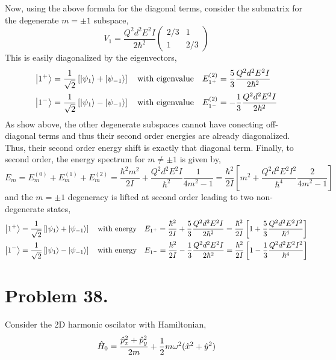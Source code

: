\documentclass[12pt]{extarticle}
\begin{document}
Now, using the above formula for the diagonal terms, consider the submatrix for the degenerate $m = \pm 1$ subspace,
\[ V_1 = \frac{Q^2 d^2 E^2 I}{2\hbar^2} \begin{pmatrix}
2/3 & 1 \\
1 & 2/3 
\end{pmatrix}\]
This is easily diagonalized by the eigenvectors,
\begin{align*}
\left| 1^{+} \right> & = \frac{1}{\sqrt{2}} \left[ \left| \psi_1 \right> + \left| \psi_{-1} \right> \right] \quad \text{with eigenvalue} \quad E^{(2)}_{1^+} = \frac{5}{3} \frac{Q^2 d^2 E^2 I}{2\hbar^2}   \\ 
\left| 1^{-} \right> & = \frac{1}{\sqrt{2}} \left[ \left| \psi_1 \right> - \left| \psi_{-1} \right> \right]  \quad \text{with eigenvalue} \quad E^{(2)}_{1^-} = - \frac{1}{3} \frac{Q^2 d^2 E^2 I}{2\hbar^2}
\end{align*}
As show above, the other degenerate subspaces cannot have conecting off-diagonal terms and thus their second order energies are already diagonalized. Thus, their second order energy shift is exactly that diagonal term. Finally, to second order, the energy spectrum for $m \neq \pm 1$ is given by,
\[E_m = E^{(0)}_m + E^{(1)}_m + E^{(2)}_m = \frac{\hbar^2 m^2}{2 I} + \frac{Q^2 d^2 E^2 I}{\hbar^2} \frac{1}{4m^2 - 1} = \frac{\hbar^2}{2I} \left[ m^2 + \frac{Q^2 d^2 E^2 I^2}{\hbar^4} \frac{2}{4 m^2 - 1} \right] \] 
and the $m = \pm 1$ degeneracy is lifted at second order leading to two non-degenerate states, 
\begin{align*}
\left| 1^{+} \right> & = \frac{1}{\sqrt{2}} \left[ \left| \psi_1 \right> + \left| \psi_{-1} \right> \right] \quad \text{with energy} \quad E_{1^+}  = \frac{\hbar^2}{2 I} + \frac{5}{3} \frac{Q^2 d^2 E^2 I}{2\hbar^2}  = \frac{\hbar^2}{2I} \left[1 + \frac{5}{3} \frac{Q^2 d^2 E^2 I^2}{\hbar^4} \right]  \\ 
\left| 1^{-} \right> & = \frac{1}{\sqrt{2}} \left[ \left| \psi_1 \right> - \left| \psi_{-1} \right> \right]  \quad \text{with energy} \quad E_{1^-} = \frac{\hbar^2}{2 I} - \frac{1}{3} \frac{Q^2 d^2 E^2 I}{2\hbar^2} = \frac{\hbar^2}{2I} \left[1 - \frac{1}{3} \frac{Q^2 d^2 E^2 I^2}{\hbar^4} \right] 
\end{align*}

\section*{Problem 38.}
Consider the 2D harmonic oscilator with Hamiltonian,
\[\hat{H}_0 = \frac{\hat{p}^2_x + \hat{p}^2_y}{2m} + \frac{1}{2} m \omega^2 (\hat{x}^2 + \hat{y}^2) \] 
\end{document}
